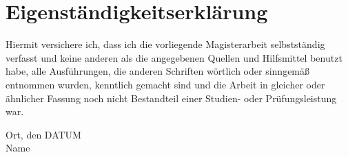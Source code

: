 \chapter{Eigenständigkeitserklärung}

Hiermit versichere ich, dass ich die vorliegende Magisterarbeit
selbstständig verfasst und keine anderen als die angegebenen Quellen
und Hilfsmittel benutzt habe, alle Ausführungen, die anderen Schriften
wörtlich oder sinngemäß entnommen wurden, kenntlich gemacht sind und
die Arbeit in gleicher oder ähnlicher Fassung noch nicht Bestandteil
einer Studien- oder Prüfungsleistung war.

\hspace{5ex}

Ort, den DATUM \\[7ex]
Name
